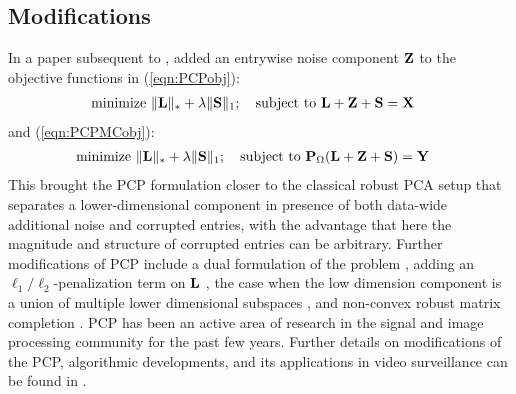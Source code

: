\subsection*{\sffamily \large Modifications}
In a paper subsequent to \cite{CandesEtal09}, \cite{ZhouEtal10} added an entrywise noise component ${\mathbf{Z}}$ to the objective functions in (\ref{eqn:PCPobj}):
%
\begin{align}\label{eqn:PCPobjZ}
& \text{minimize } \| {\mathbf{L}} \|_* + \lambda \| {\mathbf{S}} \|_1; \quad \text{subject to } {\mathbf{L}} + {\mathbf{Z}} + {\mathbf{S}} = {\mathbf{X}}
\end{align}
%
and (\ref{eqn:PCPMCobj}):
%
\begin{align}\label{eqn:PCPMCobjZ}
& \text{minimize } \| {\mathbf{L}} \|_* + \lambda \| {\mathbf{S}} \|_1; \quad \text{subject to } {\mathbf{P}}_\Omega({\mathbf{L}} + {\mathbf{Z}} + {\mathbf{S}}) = {\mathbf{Y}}
\end{align}
%
This brought the PCP formulation closer to the classical robust PCA setup that separates a lower-dimensional component in presence of both data-wide additional noise and corrupted entries, with the advantage that here the magnitude and structure of corrupted entries can be arbitrary. Further modifications of PCP include a dual formulation of the problem \citep{BeckerEtal11}, adding an $\ell_1/\ell_2$-penalization term on ${\mathbf{L}}$ \citep{TangNehorai11}, the case when the low dimension component is a union of multiple lower dimensional subspaces \citep{WohlbergEtal12}, and non-convex robust matrix completion \citep{ShangEtal14}. PCP has been an active area of research in the signal and image processing community for the past few years. Further details on modifications of the PCP, algorithmic developments, and its applications in video surveillance can be found in \cite{Bouwmans14}.